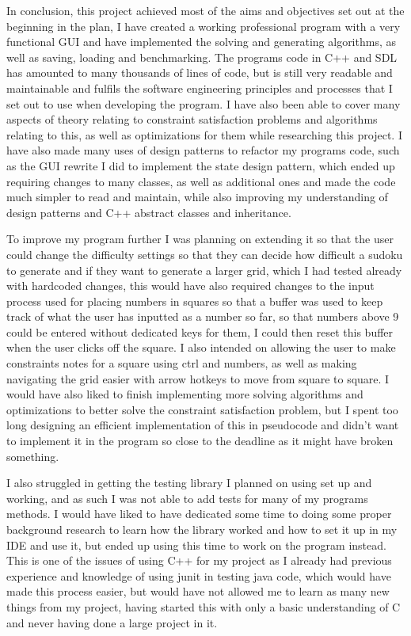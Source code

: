 \documentclass[]{final_report}
\begin{document}
In conclusion, this project achieved most of the aims and objectives set out at the beginning in the plan, I have created a working professional program with a very functional GUI and have implemented the solving and generating algorithms, as well as saving, loading and benchmarking. The programs code in C++ and SDL has amounted to many thousands of lines of code, but is still very readable and maintainable and fulfils the software engineering principles and processes that I set out to use when developing the program. I have also been able to cover many aspects of theory relating to constraint satisfaction problems and algorithms relating to this, as well as optimizations for them while researching this project. I have also made many uses of design patterns to refactor my programs code, such as the GUI rewrite I did to implement the state design pattern, which ended up requiring changes to many classes, as well as additional ones and made the code much simpler to read and maintain, while also improving my understanding of design patterns and C++ abstract classes and inheritance.

To improve my program further I was planning on extending it so that the user could change the difficulty settings so that they can decide how difficult a sudoku to generate and if they want to generate a larger grid, which I had tested already with hardcoded changes, this would have also required changes to the input process used for placing numbers in squares so that a buffer was used to keep track of what the user has inputted as a number so far, so that numbers above 9 could be entered without dedicated keys for them, I could then reset this buffer when the user clicks off the square. I also intended on allowing the user to make constraints notes for a square using ctrl and numbers, as well as making navigating the grid easier with arrow hotkeys to move from square to square. I would have also liked to finish implementing more solving algorithms and optimizations to better solve the constraint satisfaction problem, but I spent too long designing an efficient implementation of this in pseudocode and didn't want to implement it in the program so close to the deadline as it might have broken something.

I also struggled in getting the testing library I planned on using set up and working, and as such I was not able to add tests for many of my programs methods. I would have liked to have dedicated some time to doing some proper background research to learn how the library worked and how to set it up in my IDE and use it, but ended up using this time to work on the program instead. This is one of the issues of using C++ for my project as I already had previous experience and knowledge of using junit in testing java code, which would have made this process easier, but would have not allowed me to learn as many new things from my project, having started this with only a basic understanding of C and never having done a large project in it.
\end{document}

